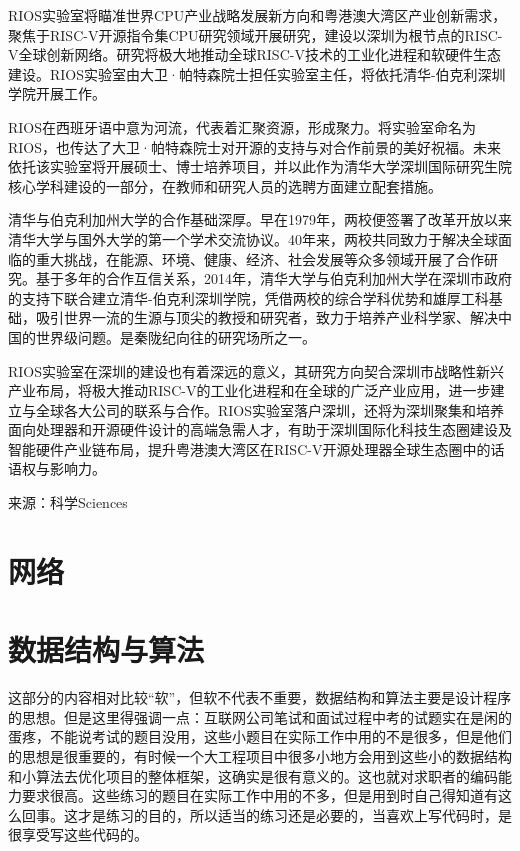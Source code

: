 \documentclass[utf8]{book}
\begin{document}
	RIOS实验室将瞄准世界CPU产业战略发展新方向和粤港澳大湾区产业创新需求，聚焦于RISC-V开源指令集CPU研究领域开展研究，建设以深圳为根节点的RISC-V全球创新网络。研究将极大地推动全球RISC-V技术的工业化进程和软硬件生态建设。RIOS实验室由大卫·帕特森院士担任实验室主任，将依托清华-伯克利深圳学院开展工作。

	
	RIOS在西班牙语中意为河流，代表着汇聚资源，形成聚力。将实验室命名为RIOS，也传达了大卫·帕特森院士对开源的支持与对合作前景的美好祝福。未来依托该实验室将开展硕士、博士培养项目，并以此作为清华大学深圳国际研究生院核心学科建设的一部分，在教师和研究人员的选聘方面建立配套措施。
	
	清华与伯克利加州大学的合作基础深厚。早在1979年，两校便签署了改革开放以来清华大学与国外大学的第一个学术交流协议。40年来，两校共同致力于解决全球面临的重大挑战，在能源、环境、健康、经济、社会发展等众多领域开展了合作研究。基于多年的合作互信关系，2014年，清华大学与伯克利加州大学在深圳市政府的支持下联合建立清华-伯克利深圳学院，凭借两校的综合学科优势和雄厚工科基础，吸引世界一流的生源与顶尖的教授和研究者，致力于培养产业科学家、解决中国的世界级问题。是秦陇纪向往的研究场所之一。
	
	RIOS实验室在深圳的建设也有着深远的意义，其研究方向契合深圳市战略性新兴产业布局，将极大推动RISC-V的工业化进程和在全球的广泛产业应用，进一步建立与全球各大公司的联系与合作。RIOS实验室落户深圳，还将为深圳聚集和培养面向处理器和开源硬件设计的高端急需人才，有助于深圳国际化科技生态圈建设及智能硬件产业链布局，提升粤港澳大湾区在RISC-V开源处理器全球生态圈中的话语权与影响力。
	
	来源：科学Sciences

	\section{网络}
	\section{数据结构与算法}
	
	这部分的内容相对比较“软”，但软不代表不重要，数据结构和算法主要是设计程序的思想。但是这里得强调一点：互联网公司笔试和面试过程中考的试题实在是闲的蛋疼，不能说考试的题目没用，这些小题目在实际工作中用的不是很多，但是他们的思想是很重要的，有时候一个大工程项目中很多小地方会用到这些小的数据结构和小算法去优化项目的整体框架，这确实是很有意义的。这也就对求职者的编码能力要求很高。这些练习的题目在实际工作中用的不多，但是用到时自己得知道有这么回事。这才是练习的目的，所以适当的练习还是必要的，当喜欢上写代码时，是很享受写这些代码的。
	
\end{document}
